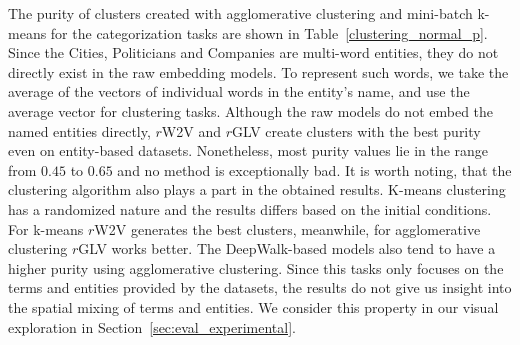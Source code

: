 The purity of clusters created with agglomerative clustering and mini-batch k-means for the categorization tasks are shown in Table~\ref{clustering_normal_p}. Since the Cities, Politicians and Companies are multi-word entities, they do not directly exist in the raw embedding models. To represent such words, we take the average of the vectors of individual words in the entity's name, and use the average vector for clustering tasks. Although the raw models do not embed the named entities directly, $r$W2V and $r$GLV create clusters with the best purity even on entity-based datasets. Nonetheless, most purity values lie in the range from $0.45$ to $0.65$ and no method is exceptionally bad. It is worth noting, that the clustering algorithm also plays a part in the obtained results. K-means clustering has a randomized nature and the results differs based on the initial conditions. For k-means $r$W2V generates the best clusters, meanwhile, for agglomerative clustering $r$GLV works better. The DeepWalk-based models also tend to have a higher purity using agglomerative clustering. Since this tasks only focuses on the terms and entities provided by the datasets, the results do not give us insight into the spatial mixing of terms and entities. We consider this property in our visual exploration in Section~\ref{sec:eval_experimental}.
